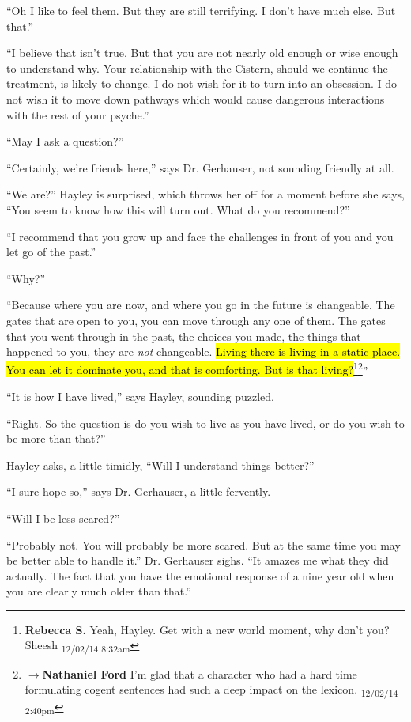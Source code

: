 ``Oh I like to feel them. But they are still terrifying.  I don't have much else.  But that.''

``I believe that isn't true.  But that you are not nearly old enough or wise enough to understand why.  Your relationship with the Cistern, should we continue the treatment, is likely to change.  I do not wish for it to turn into an obsession.  I do not wish it to move down pathways which would cause dangerous interactions with the rest of your psyche.''

``May I ask a question?''

``Certainly, we're friends here,'' says Dr. Gerhauser, not sounding friendly at all.

``We are?''  Hayley is surprised, which throws her off for a moment before she says, ``You seem to know how this will turn out. What do you recommend?''

``I recommend that you grow up and face the challenges in front of you and you let go of the past.''

``Why?''

``Because where you are now, and where you go in the future is changeable.  The gates that are open to you, you can move through any one of them.  The gates that you went through in the past, the choices you made, the things that happened to you, they are \textit{not} changeable.  \hl{Living there is living in a static place.  You can let it dominate you, and that is comforting.  But is that living?}\footnote{\textbf{Rebecca S. }Yeah, Hayley.  Get with a new world moment, why don't you? Sheesh \textsubscript{12/02/14 8:32am}}\footnote{$\rightarrow$\textbf{Nathaniel Ford }I'm glad that a character who had a hard time formulating cogent sentences had such a deep impact on the lexicon. \textsubscript{12/02/14 2:40pm}}''

``It is how I have lived,'' says Hayley, sounding puzzled.

``Right.  So the question is do you wish to live as you have lived, or do you wish to be more than that?''

Hayley asks, a little timidly, ``Will I understand things better?''

``I sure hope so,'' says Dr. Gerhauser, a little fervently.

``Will I be less scared?''

``Probably not.  You will probably be more scared.  But at the same time you may be better able to handle it.''  Dr. Gerhauser sighs.  ``It amazes me what they did actually.  The fact that you have the emotional response of a nine year old when you are clearly much older than that.''

